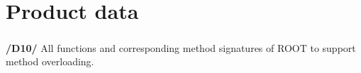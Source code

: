\chapter{Product data}

\paragraph{}
\textbf{/D10/}
All functions and corresponding method signatures of ROOT to support method overloading.
